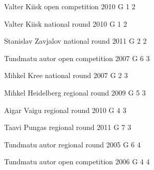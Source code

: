 \documentclass[11pt]{article}
\begin{document}
\ylDisplay{} %
{Valter Kiisk} %
{open competition} %
{2010} %
{G 1} %
{2} %
{

\ifEngSolution
\fi
}

\ylDisplay{} %
{Valter Kiisk} %
{national round} %
{2010} %
{G 1} %
{2} %
{

\ifEngSolution
\fi
}

\ylDisplay{} %
{Stanislav Zavjalov} %
{national round} %
{2011} %
{G 2} %
{2} %
{

\ifEngSolution
\fi
}

\ylDisplay{} %
{Tundmatu autor} %
{open competition} %
{2007} %
{G 6} %
{3} %
{

\ifEngSolution
\fi
}

\ylDisplay{} %
{Mihkel Kree} %
{national round} %
{2007} %
{G 2} %
{3} %
{

\ifEngSolution
\fi
}

\ylDisplay{} %
{Mihkel Heidelberg} %
{regional round} %
{2009} %
{G 5} %
{3} %
{

\ifEngSolution
\fi
}

\ylDisplay{} %
{Aigar Vaigu} %
{regional round} %
{2010} %
{G 4} %
{3} %
{

\ifEngSolution
\fi
}

\ylDisplay{} %
{Taavi Pungas} %
{regional round} %
{2011} %
{G 7} %
{3} %
{

\ifEngSolution
\fi
}

\ylDisplay{} %
{Tundmatu autor} %
{regional round} %
{2005} %
{G 6} %
{4} %
{

\ifEngSolution
\fi
}

\ylDisplay{} %
{Tundmatu autor} %
{open competition} %
{2006} %
{G 4} %
{4} %
{

\ifEngSolution
\fi
}
\end{document}
